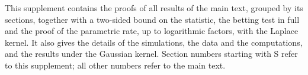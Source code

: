 This supplement contains the proofs of all results of the main text, grouped by its sections, together with a
two-sided bound on the statistic, the betting test in full and the proof of the parametric rate, up to logarithmic
factors, with the Laplace kernel. It also gives the details of the simulations, the data and the computations, and the
results under the Gaussian kernel. Section numbers starting with S refer to this supplement; all other numbers refer to
the main text.
